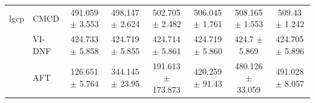 \begin{table}[!ht]
{\begin{tabular}{l|l|cccccc}
        \midrule
        lgcp & CMCD & 491.059 $\pm$ 3.553 & 498.147 $\pm$ 2.624 & 502.705 $\pm$ 2.482 & 506.045 $\pm$ 1.761 & 508.165 $\pm$ 1.553 & 509.43 $\pm$ 1.242 \\ 
        ~ & VI-DNF & 424.733 $\pm$ 5.858 & 424.719 $\pm$ 5.855 & 424.714 $\pm$ 5.861 & 424.719 $\pm$ 5.860 & 424.7 $\pm$ 5.869 & 424.705 $\pm$ 5.896 \\ 
        ~ & AFT & 126.651$\pm$ 5.764 & 344.145$\pm$ 23.95 & 191.613$\pm$ 173.873 & 420.259$\pm$ 91.43 & 480.126$\pm$ 33.059 & 491.028$\pm$ 8.057 \\ 
\bottomrule
    \end{tabular}
    }
\end{table}

